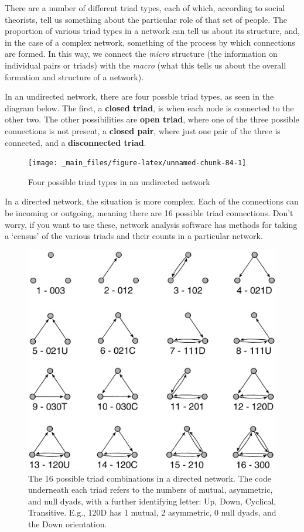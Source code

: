 \documentclass[
]{book}
\begin{document}
There are a number of different triad types, each of which, according to social theorists, tell us something about the particular role of that set of people. The proportion of various triad types in a network can tell us about its structure, and, in the case of a complex network, something of the process by which connections are formed. In this way, we connect the \emph{micro} structure (the information on individual pairs or triads) with the \emph{macro} (what this tells us about the overall formation and structure of a network).

In an undirected network, there are four possble triad types, as seen in the diagram below. The first, a \textbf{closed triad}, is when each node is connected to the other two. The other possibilities are \textbf{open triad}, where one of the three possible connections is not present, a \textbf{closed pair}, where just one pair of the three is connected, and a \textbf{disconnected triad}.

\begin{figure}

{\centering \texttt{[image: \_main\_files/figure-latex/unnamed-chunk-84-1]} 

}

\caption{Four possible triad types in an undirected network}\label{fig:unnamed-chunk-84}
\end{figure}

In a directed network, the situation is more complex. Each of the connections can be incoming or outgoing, meaning there are 16 possible triad connections. Don't worry, if you want to use these, network analysis software has methods for taking a `census' of the various triads and their counts in a particular network.

\begin{figure}
\centering
\includegraphics{images/triad_census.jpg}
\caption{The 16 possible triad combinations in a directed network. The code underneath each triad refers to the numbers of mutual, asymmetric, and null dyads, with a further identifying letter: Up, Down, Cyclical, Transitive. E.g., 120D has 1 mutual, 2 asymmetric, 0 null dyads, and the Down orientation.}
\end{figure}
\end{document}
